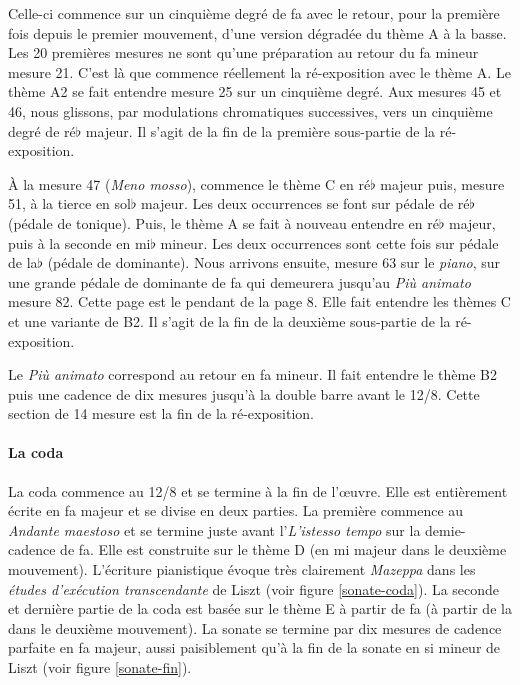 Celle-ci commence sur un cinquième degré de fa avec le retour, pour la première fois depuis le premier mouvement, d'une version dégradée du thème A à la basse. Les 20 premières mesures ne sont qu'une préparation au retour du fa mineur mesure 21. C'est là que commence réellement la ré-exposition avec le thème A. Le thème A2 se fait entendre mesure 25 sur un cinquième degré. Aux mesures 45 et 46, nous glissons, par modulations chromatiques successives, vers un cinquième degré de ré$\flat$ majeur. Il s'agit de la fin de la première sous-partie de la ré-exposition.

À la mesure 47 (\emph{Meno mosso}), commence le thème C en ré$\flat$ majeur puis, mesure 51, à la tierce en sol$\flat$ majeur. Les deux occurrences se font sur pédale de ré$\flat$ (pédale de tonique). Puis, le thème A se fait à nouveau entendre en ré$\flat$ majeur, puis à la seconde en mi$\flat$ mineur. Les deux occurrences sont cette fois sur pédale de la$\flat$ (pédale de dominante). Nous arrivons ensuite, mesure 63 sur le \emph{piano}, sur une grande pédale de dominante de fa qui demeurera jusqu'au \emph{Più animato} mesure 82. Cette page est le pendant de la page 8. Elle fait entendre les thèmes C et une variante de B2. Il s'agit de la fin de la deuxième sous-partie de la ré-exposition.

Le \emph{Più animato} correspond au retour en fa mineur. Il fait entendre le thème B2 puis une cadence de dix mesures jusqu'à la double barre avant le 12/8. Cette section de 14 mesure est la fin de la ré-exposition.

\newpage

\paragraph{La coda}

La coda commence au 12/8 et se termine à la fin de l'œuvre. Elle est entièrement écrite en fa majeur et se divise en deux parties. La première commence au \emph{Andante maestoso} et se termine juste avant l'\emph{L'istesso tempo} sur la demie-cadence de fa. Elle est construite sur le thème D (en mi majeur dans le deuxième mouvement). L'écriture pianistique évoque très clairement \emph{Mazeppa} dans les \emph{études d'exécution transcendante} de Liszt (voir figure \ref{sonate-coda}). La seconde et dernière partie de la coda est basée sur le thème E à partir de fa (à partir de la dans le deuxième mouvement). La sonate se termine par dix mesures de cadence parfaite en fa majeur, aussi paisiblement qu'à la fin de la sonate en si mineur de Liszt (voir figure \ref{sonate-fin}).\\


